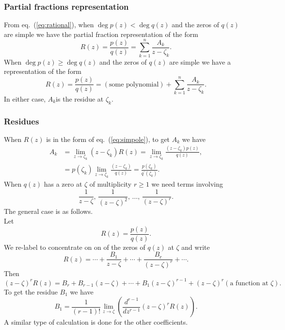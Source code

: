 \documentclass{article}
\begin{document}
\subsubsection{Partial fractions representation}
From eq.~(\ref{eq:rational}), when $\deg p(z)<\deg q(z)$ and the zeros of $q(z)$ are simple we have the partial fraction representation of the form
\begin{equation}
    R(z) = \frac{p(z)}{q(z)} = \sum_{k=1}^n \frac{A_k}{z-\zeta_k}.
\end{equation}
When $\deg p(z)\geq \deg q(z)$ and the zeros of $q(z)$ are simple we have a representation of the form
\begin{equation}
    R(z) = \frac{p(z)}{q(z)} = (\text{some polynomial}) + \sum_{k=1}^n \frac{A_k}{z-\zeta_k}. \label{eq:simpole}
\end{equation}
In either case, $A_k$is the residue at $\zeta_k$.

\subsubsection{Residues}
When $R(z)$ is in the form of eq.~(\ref{eq:simpole}), to get $A_k$ we have
\begin{align}
    A_k &= \lim_{z\to\zeta_k}(z-\zeta_k)R(z) = \lim_{z\to\zeta_k}\frac{(z-\zeta_k)p(z)}{q(z)}, \nonumber \\
    &= p(\zeta_k)\lim_{z\to\zeta_k}\frac{(z-\zeta_k)}{q(z)} = \frac{p(\zeta_k)}{q^\prime(\zeta_k)}.
\end{align}
When $q(z)$ has a zero at $\zeta$ of multiplicity $r\geq 1$ we need terms involving
\begin{equation}
    \frac{1}{z-\zeta},\,\frac{1}{(z-\zeta)^2},\,\ldots,\,\frac{1}{(z-\zeta)^r}. \nonumber
\end{equation}
The general case is as follows.\\
Let
\begin{equation}
    R(z) = \frac{p(z)}{q(z)}.
\end{equation}
We re-label to concentrate on on of the zeros of $q(z)$ at $\zeta$ and write
\begin{equation}
    R(z) = \cdots + \frac{B_1}{z-\zeta}+\cdots+\frac{B_r}{(z-\zeta)^r}+\cdots .
\end{equation}
Then
\begin{equation}
    (z-\zeta)^r R(z) = B_r + B_{r-1}(z-\zeta)+\cdots+B_1(z-\zeta)^{r-1} + (z-\zeta)^r(\text{a function at }\zeta).
\end{equation}
To get the residue $B_1$ we have
\begin{equation}
    B_1 = \frac{1}{(r-1)!}\lim_{z\to\zeta}\left( \frac{d^{r-1}}{dz^{r-1}}(z-\zeta)^r R(z) \right).
\end{equation}
A similar type of calculation is done for the other coefficients. 
\end{document}
